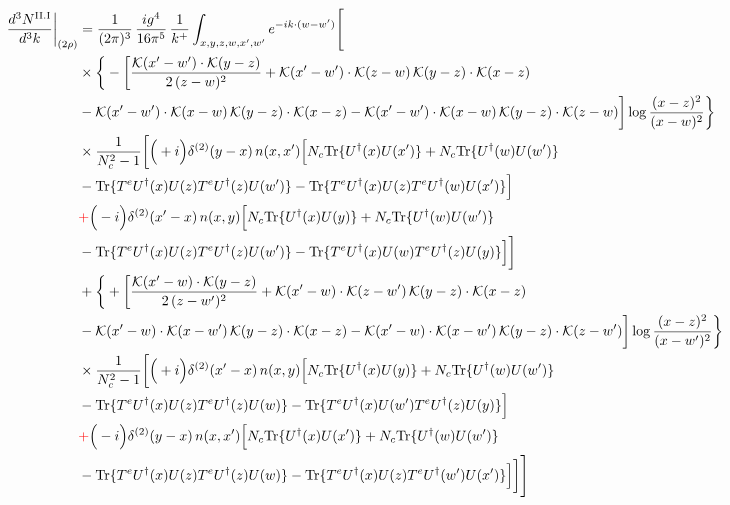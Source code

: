 \documentclass[9pt]{article}
\numberwithin{equation}{section}
\begin{document}
\begin{align}
\frac{d^{3}N^{\rm II.I}}{d^{3}k}\bigg|_{(2\rho)} &=\frac{1}{(2\pi)^{3}}\,\frac{ig^{4}}{16\pi^{5}}\,\frac{1}{k^{+}}\int_{x,y,z,w,x',w'}e^{-ik\cdot(w-w')}\Bigg[\notag\\
&\times\bigg\{-\bigg[\frac{\mathcal{K}(x'-w')\cdot\mathcal{K}(y-z)}{2\,(z-w)^{2}}+\mathcal{K}(x'-w')\cdot\mathcal{K}(z-w)\,\mathcal{K}(y-z)\cdot\mathcal{K}(x-z)\notag\\
&-\mathcal{K}(x'-w')\cdot\mathcal{K}(x-w)\,\mathcal{K}(y-z)\cdot\mathcal{K}(x-z)-\mathcal{K}(x'-w')\cdot\mathcal{K}(x-w)\,\mathcal{K}(y-z)\cdot\mathcal{K}(z-w)\bigg]\log\frac{(x-z)^{2}}{(x-w)^{2}}\bigg\}\notag\\
&\times \frac{1}{N_{c}^{2}-1}\bigg[\Big(+i\Big)\delta^{(2)}(y-x)\,n(x,x')\Big[N_{c}{\rm Tr}\{U^{\dagger}(x)U(x')\}+N_{c}{\rm Tr}\{U^{\dagger}(w)U(w')\}\notag\\
& -{\rm Tr}\{T^{e}U^{\dagger}(x)U(z)T^{e}U^{\dagger}(z)U(w')\}-{\rm Tr}\{T^{e}U^{\dagger}(x)U(z)T^{e}U^{\dagger}(w)U(x')\}\Big]\notag\\
& {\color{red}+}\Big(-i\Big)\delta^{(2)}(x'-x)\,n(x,y)\Big[N_{c}{\rm Tr}\{U^{\dagger}(x)U(y)\}+N_{c}{\rm Tr}\{U^{\dagger}(w)U(w')\}\notag\\
& -{\rm Tr}\{T^{e}U^{\dagger}(x)U(z)T^{e}U^{\dagger}(z)U(w')\}-{\rm Tr}\{T^{e}U^{\dagger}(x)U(w)T^{e}U^{\dagger}(z)U(y)\}\Big]\bigg]\notag\\
&+\bigg\{+\bigg[\frac{\mathcal{K}(x'-w)\cdot\mathcal{K}(y-z)}{2\,(z-w')^{2}}+\mathcal{K}(x'-w)\cdot\mathcal{K}(z-w')\,\mathcal{K}(y-z)\cdot\mathcal{K}(x-z)\notag\\
&-\mathcal{K}(x'-w)\cdot\mathcal{K}(x-w')\,\mathcal{K}(y-z)\cdot\mathcal{K}(x-z)-\mathcal{K}(x'-w)\cdot\mathcal{K}(x-w')\,\mathcal{K}(y-z)\cdot\mathcal{K}(z-w')\bigg]\log\frac{(x-z)^{2}}{(x-w')^{2}}\bigg\}\notag\\
&\times \frac{1}{N_{c}^{2}-1}\bigg[\Big(+i\Big)\delta^{(2)}(x'-x)\,n(x,y)\Big[N_{c}{\rm Tr}\{U^{\dagger}(x)U(y)\}+N_{c}{\rm Tr}\{U^{\dagger}(w)U(w')\}\notag\\
& -{\rm Tr}\{T^{e}U^{\dagger}(x)U(z)T^{e}U^{\dagger}(z)U(w)\}-{\rm Tr}\{T^{e}U^{\dagger}(x)U(w')T^{e}U^{\dagger}(z)U(y)\}\Big]\notag\\
& {\color{red}+}\Big(-i\Big)\delta^{(2)}(y-x)\,n(x,x')\Big[N_{c}{\rm Tr}\{U^{\dagger}(x)U(x')\}+N_{c}{\rm Tr}\{U^{\dagger}(w)U(w')\}\notag\\
& -{\rm Tr}\{T^{e}U^{\dagger}(x)U(z)T^{e}U^{\dagger}(z)U(w)\}-{\rm Tr}\{T^{e}U^{\dagger}(x)U(z)T^{e}U^{\dagger}(w')U(x')\}\Big]\bigg]\Bigg]\label{eq:E-II.I-2}
\end{align}
\end{document}
